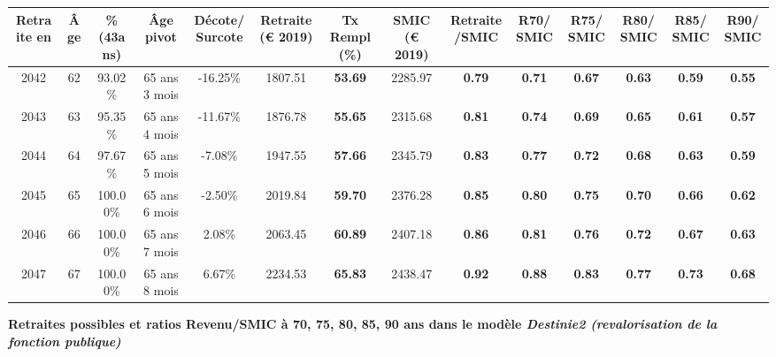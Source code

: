 \begin{adjustbox}{max width=\textwidth} 
\begin{tabular}[htb]{|c|c||c|c|c||c|c||c|c||c|c|c|c|c|} 
\hline 
 Retraite en &  Âge &  \%(43ans) &  Âge pivot &  Décote/Surcote &  Retraite (\euro{} 2019) &  Tx Rempl(\%) &  SMIC (\euro{} 2019) &  Retraite/SMIC &  R70/SMIC &  R75/SMIC &  R80/SMIC &  R85/SMIC &  R90/SMIC \\ 
\hline \hline 
 2042 &  62 &  93.02\% &  65 ans 3 mois &  -16.25\% &  1807.51 &  {\bf 53.69} &  2285.97 &  {\bf {\color{red} 0.79}} &  {\bf {\color{red} 0.71}} &  {\bf {\color{red} 0.67}} &  {\bf {\color{red} 0.63}} &  {\bf {\color{red} 0.59}} &  {\bf {\color{red} 0.55}} \\ 
\hline 
 2043 &  63 &  95.35\% &  65 ans 4 mois &  -11.67\% &  1876.78 &  {\bf 55.65} &  2315.68 &  {\bf {\color{red} 0.81}} &  {\bf {\color{red} 0.74}} &  {\bf {\color{red} 0.69}} &  {\bf {\color{red} 0.65}} &  {\bf {\color{red} 0.61}} &  {\bf {\color{red} 0.57}} \\ 
\hline 
 2044 &  64 &  97.67\% &  65 ans 5 mois &  -7.08\% &  1947.55 &  {\bf 57.66} &  2345.79 &  {\bf {\color{red} 0.83}} &  {\bf {\color{red} 0.77}} &  {\bf {\color{red} 0.72}} &  {\bf {\color{red} 0.68}} &  {\bf {\color{red} 0.63}} &  {\bf {\color{red} 0.59}} \\ 
\hline 
 2045 &  65 &  100.00\% &  65 ans 6 mois &  -2.50\% &  2019.84 &  {\bf 59.70} &  2376.28 &  {\bf {\color{red} 0.85}} &  {\bf {\color{red} 0.80}} &  {\bf {\color{red} 0.75}} &  {\bf {\color{red} 0.70}} &  {\bf {\color{red} 0.66}} &  {\bf {\color{red} 0.62}} \\ 
\hline 
 2046 &  66 &  100.00\% &  65 ans 7 mois &  2.08\% &  2063.45 &  {\bf 60.89} &  2407.18 &  {\bf {\color{red} 0.86}} &  {\bf {\color{red} 0.81}} &  {\bf {\color{red} 0.76}} &  {\bf {\color{red} 0.72}} &  {\bf {\color{red} 0.67}} &  {\bf {\color{red} 0.63}} \\ 
\hline 
 2047 &  67 &  100.00\% &  65 ans 8 mois &  6.67\% &  2234.53 &  {\bf 65.83} &  2438.47 &  {\bf {\color{red} 0.92}} &  {\bf {\color{red} 0.88}} &  {\bf {\color{red} 0.83}} &  {\bf {\color{red} 0.77}} &  {\bf {\color{red} 0.73}} &  {\bf {\color{red} 0.68}} \\ 
\hline 
\hline 
\end{tabular} 
\end{adjustbox} 
 
 \vspace{0.1cm} 
{\bf \noindent Retraites possibles et ratios Revenu/SMIC à 70, 75, 80, 85, 90 ans dans le modèle \emph{Destinie2 (revalorisation de la fonction publique)}}  
 
